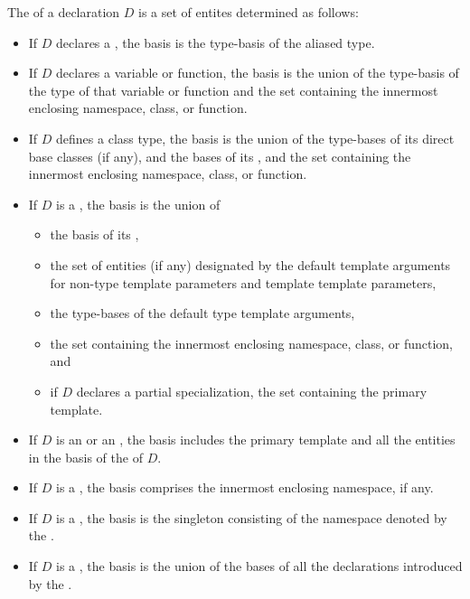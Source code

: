 \begin{std.txt}
\alinea
The  of a declaration $D$ is a set of entites determined as follows:
\begin{itemize}
\item If $D$ declares a , the basis is the
type-basis of the aliased type.

\item If $D$ declares a variable or function,
the basis is the union of
the type-basis of the type of that variable or function
and the set containing the
innermost enclosing namespace, class, or function.

\item If $D$ defines a class type, the basis is the union of the
type-bases of its direct base classes (if any), and the bases of
its ,
and the set containing the
innermost enclosing namespace, class, or function.

\item If $D$ is a ,
the basis is the union
of
\begin{itemize}
\item
the basis of its ,
\item
the set of entities (if any) designated by
the default template arguments for
non-type template parameters and template template parameters,
\item
the type-bases of the default type template arguments,
\item
the set containing the
innermost enclosing namespace, class, or function, and
\item
if $D$ declares a partial specialization,
the set containing the primary template.
\end{itemize}

\item If $D$ is an 
or an , the basis includes
the primary template and all the entities in the basis of the
 of $D$.

\item If $D$ is a , the basis comprises
the innermost enclosing namespace, if any.

\item If $D$ is a , the basis is the 
singleton consisting of the namespace denoted by the
.

\item If $D$ is a , the basis is the union
of the bases of all the declarations introduced by
the .


\end{itemize}
\end{std.txt}
